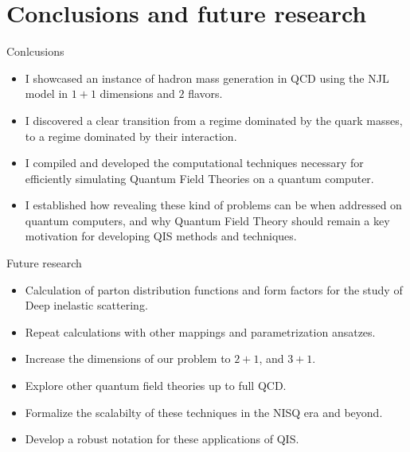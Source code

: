
\section{Conclusions and future research}


\begin{frame}{Conlcusions}

	\begin{itemize}
		\item I showcased an instance of hadron mass generation in QCD using the NJL model in $1+1$ dimensions and $2$ flavors.
    \item I discovered a clear transition from a regime dominated by the quark masses, to a regime dominated by their interaction.
    \item I compiled and developed the computational techniques necessary for efficiently simulating Quantum Field Theories on a quantum computer.
    \item I established how revealing these kind of problems can be when addressed on quantum computers, and why Quantum Field Theory should remain a key motivation for developing QIS methods and techniques.
	\end{itemize}

\end{frame}


\begin{frame}{Future research}

  \begin{itemize}
    \item Calculation of parton distribution functions and form factors for the study of Deep inelastic scattering.
    \item Repeat calculations with other mappings and parametrization ansatzes.
    \item Increase the dimensions of our problem to $2+1$, and $3+1$.
    \item Explore other quantum field theories up to full QCD.
    \item Formalize the scalabilty of these techniques in the NISQ era and beyond.
    \item Develop a robust notation for these applications of QIS.
  \end{itemize}

\end{frame}
